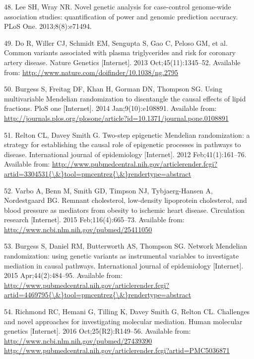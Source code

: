 \documentclass[]{article}
\begin{document}
\hypertarget{ref-Lee2013c}{}
48. Lee SH, Wray NR. Novel genetic analysis for case-control genome-wide
association studies: quantification of power and genomic prediction
accuracy. PLoS One. 2013;8(8):e71494.

\hypertarget{ref-Do2013}{}
49. Do R, Willer CJ, Schmidt EM, Sengupta S, Gao C, Peloso GM, et al.
Common variants associated with plasma triglycerides and risk for
coronary artery disease. Nature Genetics {[}Internet{]}. 2013
Oct;45(11):1345--52. Available from:
\url{http://www.nature.com/doifinder/10.1038/ng.2795}

\hypertarget{ref-Burgess2014a}{}
50. Burgess S, Freitag DF, Khan H, Gorman DN, Thompson SG. Using
multivariable Mendelian randomization to disentangle the causal effects
of lipid fractions. PloS one {[}Internet{]}. 2014 Jan;9(10):e108891.
Available from:
\url{http://journals.plos.org/plosone/article?id=10.1371/journal.pone.0108891}

\hypertarget{ref-Relton2012}{}
51. Relton CL, Davey Smith G. Two-step epigenetic Mendelian
randomization: a strategy for establishing the causal role of epigenetic
processes in pathways to disease. International journal of epidemiology
{[}Internet{]}. 2012 Feb;41(1):161--76. Available from:
\href{http://www.pubmedcentral.nih.gov/articlerender.fcgi?artid=3304531\%7B/\&\%7Dtool=pmcentrez\%7B/\&\%7Drendertype=abstract}{http://www.pubmedcentral.nih.gov/articlerender.fcgi?artid=3304531\{\textbackslash{}\&\}tool=pmcentrez\{\textbackslash{}\&\}rendertype=abstract}

\hypertarget{ref-Varbo2015}{}
52. Varbo A, Benn M, Smith GD, Timpson NJ, Tybjaerg-Hansen A,
Nordestgaard BG. Remnant cholesterol, low-density lipoprotein
cholesterol, and blood pressure as mediators from obesity to ischemic
heart disease. Circulation research {[}Internet{]}. 2015
Feb;116(4):665--73. Available from:
\url{http://www.ncbi.nlm.nih.gov/pubmed/25411050}

\hypertarget{ref-Burgess2015}{}
53. Burgess S, Daniel RM, Butterworth AS, Thompson SG. Network Mendelian
randomization: using genetic variants as instrumental variables to
investigate mediation in causal pathways. International journal of
epidemiology {[}Internet{]}. 2015 Apr;44(2):484--95. Available from:
\href{http://www.pubmedcentral.nih.gov/articlerender.fcgi?artid=4469795\%7B/\&\%7Dtool=pmcentrez\%7B/\&\%7Drendertype=abstract}{http://www.pubmedcentral.nih.gov/articlerender.fcgi?artid=4469795\{\textbackslash{}\&\}tool=pmcentrez\{\textbackslash{}\&\}rendertype=abstract}

\hypertarget{ref-Richmond2016}{}
54. Richmond RC, Hemani G, Tilling K, Davey Smith G, Relton CL.
Challenges and novel approaches for investigating molecular mediation.
Human molecular genetics {[}Internet{]}. 2016 Oct;25(R2):R149--56.
Available from:
\href{http://www.ncbi.nlm.nih.gov/pubmed/27439390\%20http://www.pubmedcentral.nih.gov/articlerender.fcgi?artid=PMC5036871}{http://www.ncbi.nlm.nih.gov/pubmed/27439390 http://www.pubmedcentral.nih.gov/articlerender.fcgi?artid=PMC5036871}
\end{document}
